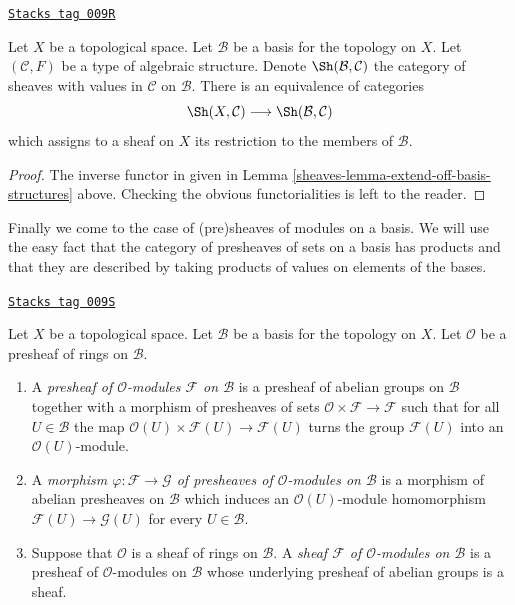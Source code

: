 \begin{lemma}
\label{sheaves-lemma-restrict-basis-equivalence-structures}
\href{https://stacks.math.columbia.edu/tag/009R}{\texttt{Stacks tag 009R}}

Let $X$ be a topological space.
Let $\mathcal{B}$ be a basis for the topology on $X$.
Let $(\mathcal{C}, F)$ be a type of algebraic structure.
Denote $\Sh(\mathcal{B}, \mathcal{C})$ the category of
sheaves with values in $\mathcal{C}$ on $\mathcal{B}$.
There is an equivalence of categories
$$
\Sh(X, \mathcal{C})
\longrightarrow
\Sh(\mathcal{B}, \mathcal{C})
$$
which assigns to a sheaf on $X$ its restriction to
the members of $\mathcal{B}$.
\end{lemma}

\begin{proof}

The inverse functor in given in
Lemma \ref{sheaves-lemma-extend-off-basis-structures} above.
Checking the obvious functorialities is left to the
reader.
\end{proof}

Finally we come to the case of (pre)sheaves of modules
on a basis. We will use the easy fact that the category
of presheaves of sets on a basis has products and that
they are described by taking products of values on
elements of the bases.

\begin{definition}
\label{sheaves-definition-sheaf-modules-basis}
\href{https://stacks.math.columbia.edu/tag/009S}{\texttt{Stacks tag 009S}}

Let $X$ be a topological space. Let $\mathcal{B}$ be a
basis for the topology on $X$. Let $\mathcal{O}$ be
a presheaf of rings on $\mathcal{B}$.
\begin{enumerate}
\item A {\it presheaf of $\mathcal{O}$-modules $\mathcal{F}$
on $\mathcal{B}$} is a presheaf of abelian groups on
$\mathcal{B}$ together with a morphism of presheaves
of sets $\mathcal{O} \times \mathcal{F} \to \mathcal{F}$
such that for all $U \in \mathcal{B}$ the map
$\mathcal{O}(U) \times \mathcal{F}(U) \to \mathcal{F}(U)$
turns the group $\mathcal{F}(U)$ into an $\mathcal{O}(U)$-module.
\item A {\it morphism $\varphi : \mathcal{F} \to \mathcal{G}$
of presheaves of $\mathcal{O}$-modules on $\mathcal{B}$}
is a morphism of abelian presheaves on $\mathcal{B}$
which induces an $\mathcal{O}(U)$-module homomorphism
$\mathcal{F}(U) \to \mathcal{G}(U)$ for every $U \in \mathcal{B}$.
\item Suppose that $\mathcal{O}$ is a sheaf of rings
on $\mathcal{B}$. A {\it sheaf $\mathcal{F}$ of $\mathcal{O}$-modules
on $\mathcal{B}$} is a presheaf of $\mathcal{O}$-modules
on $\mathcal{B}$ whose underlying presheaf of abelian groups
is a sheaf.
\end{enumerate}
\end{definition}

